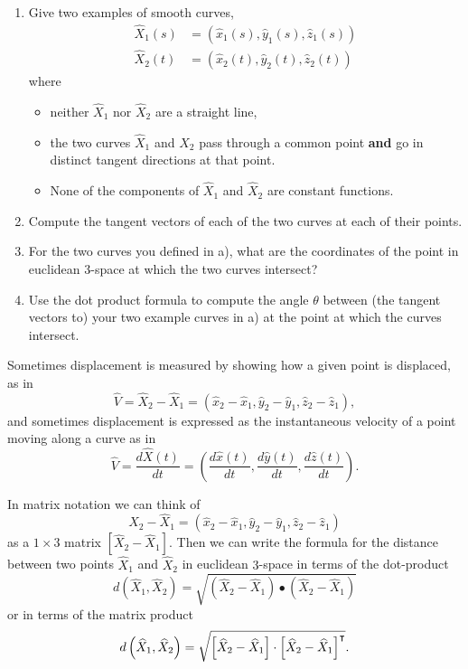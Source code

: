 \documentclass{ximera}
\begin{document}
\begin{problem}\hfil
\begin{enumerate}
\label{1}\item Give two examples of smooth curves,
\begin{align*}
\hat{X}_{1}(s) &=\left(\hat{x}_{1}(s),\hat{y}_{1}(s),\hat{z}_{1}(s)\right) \\
\hat{X}_{2}(t) &=\left(\hat{x}_{2}(t),\hat{y}_{2}(t),\hat{z}_{2}(t)\right)
\end{align*}
where
\begin{itemize}
\item neither $\hat{X}_1$ nor $\hat{X}_2$ are a straight line,
\item the two curves $\hat{X}_1$ and $\hat{X}_2$ pass through a common
  point \textbf{and} go in distinct tangent directions at that point.
\item None of the components of $\hat{X}_1$ and $\hat{X}_2$ are constant functions.
\end{itemize}

\item Compute the tangent vectors of each of the two curves at each of their points.

\item For the two curves you defined in a), what are the coordinates of the point
in euclidean $3$-space at which the two curves intersect?

\item Use the dot product formula to compute the angle $\theta$ between (the
tangent vectors to) your two example curves in a) at the point at which the
curves intersect. %
\end{enumerate}
\end{problem}

Sometimes displacement is measured by showing how a given point is displaced,
as in%
\[
\hat{V}=\hat{X}_{2}-\hat{X}_{1}=\left(  \hat{x}_{2}-\hat{x}_{1},\hat{y}%
_{2}-\hat{y}_{1},\hat{z}_{2}-\hat{z}_{1}\right)  ,
\]
and sometimes displacement is expressed as the instantaneous velocity of a
point moving along a curve as in%
\[
\hat{V}=\frac{d\hat{X}\left(  t\right)  }{dt}=\left(  \frac{d\hat{x}\left(
t\right)  }{dt},\frac{d\hat{y}\left(  t\right)  }{dt},\frac{d\hat{z}\left(
t\right)  }{dt}\right)  .
\]

In matrix notation we can think of
\[
\hat{X}_{2}-\hat{X}_{1}=\left(  \hat{x}_{2}-\hat{x}_{1},\hat{y}_{2}-\hat
{y}_{1},\hat{z}_{2}-\hat{z}_{1}\right)
\]
as a $1\times3$ matrix $\left[\hat{X}_{2}-\hat{X}_{1}\right]$. Then we can
write the formula for the distance between two points $\hat{X}_{1}$ and
$\hat{X}_{2}$ in euclidean $3$-space in terms of the dot-product%
\begin{equation}
d\left(  \hat{X}_{1},\hat{X}_{2}\right)  =\sqrt{\left(  \hat{X}_{2}-\hat
{X}_{1}\right)  \bullet\left(  \hat{X}_{2}-\hat{X}_{1}\right)  } \label{13}%
\end{equation}
or in terms of the matrix product%
\[
d\left( \hat{X}_{1},\hat{X}_{2}\right) =\sqrt{\left[
  \hat{X}_{2}-\hat{X}_{1} \right] \cdot\left[\hat{X}_{2}-\hat{X}%
  _{1}\right]^\transpose }.
\]
\end{document}
